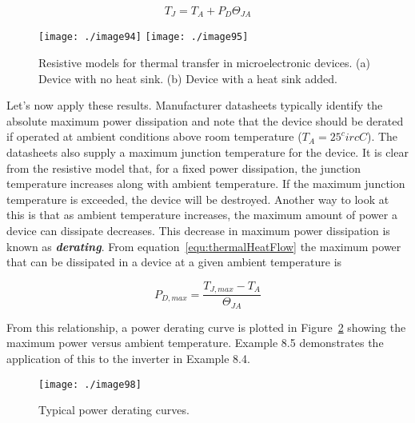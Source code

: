 \begin{equation}
\label{equ:thermalHeatFlow}
T_J = T_A + P_D \Theta_{JA}
\end{equation}

\begin{figure}
\texttt{[image: ./image94]}
\texttt{[image: ./image95]}
\caption{Resistive models for thermal transfer in
microelectronic devices. (a) Device with no heat sink. (b) Device with a
heat sink added.}
\label{figure:thermalModelAsCircuit}
\end{figure}

Let's now apply these results. Manufacturer datasheets typically
identify the absolute maximum power dissipation and note that the device
should be derated if operated at ambient conditions above room
temperature ($T_A = 25^circ C$). The datasheets
also supply a maximum junction temperature for the device. It is clear
from the resistive model that, for a fixed power dissipation, the
junction temperature increases along with ambient temperature. If the
maximum junction temperature is exceeded, the device will be destroyed.
Another way to look at this is that as ambient temperature increases,
the maximum amount of power a device can dissipate decreases. This
decrease in maximum power dissipation is known as
\emph{\textbf{derating}}. From equation~\ref{equ:thermalHeatFlow}
 the maximum power that can be
dissipated in a device at a given ambient temperature is

\begin{equation}
\label{equ:powerFunctionTemperature}
P_{D,max} = \frac{T_{J,max}  - T_A}{\Theta_{JA}}
\end{equation}

From this relationship, a power derating curve is plotted in 
Figure~\ref{figure:typicalDeratingCurve}
showing the maximum power versus ambient temperature. Example 8.5
demonstrates the application of this to the inverter in Example 8.4.

\begin{figure}
\texttt{[image: ./image98]}
\caption{Typical power derating curves.}
\label{figure:typicalDeratingCurve}
\end{figure}

